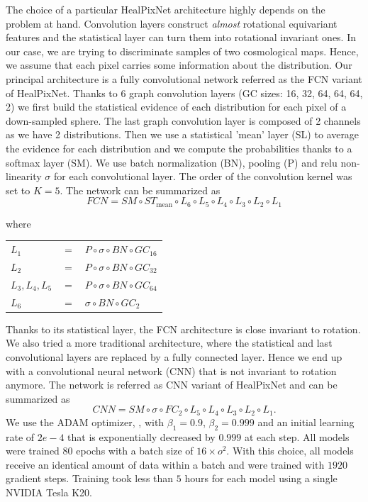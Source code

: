 \documentclass[final,twocolumn,3p,times,authoryear]{elsarticle}
\newcommand{\1}{\b{1}}              %
\newcommand{\0}{\b{0}}              %
\begin{document}
The choice of a particular HealPixNet architecture highly depends on the problem at hand. Convolution layers construct \emph{almost} rotational equivariant features and the statistical layer can turn them into rotational invariant ones. In our case, we are trying to discriminate samples of two cosmological maps. Hence, we assume that each pixel carries some information about the distribution. Our principal architecture is a fully convolutional network referred as the FCN variant of HealPixNet. Thanks to 6 graph convolution layers (GC sizes: 16, 32, 64, 64, 64, 2) we first build the statistical evidence of each distribution for each pixel of a down-sampled sphere. The last graph convolution layer is composed of 2 channels as we have 2 distributions. Then we use a statistical 'mean' layer (SL) to average the evidence for each distribution and we compute the probabilities thanks to a softmax layer (SM). We use batch normalization (BN), pooling (P) and relu non-linearity $\sigma$ for each convolutional layer. The order of the convolution kernel was set to $K=5$. The network can be summarized as
\begin{equation}
FCN = SM \circ ST_{\text{mean}} \circ L_6 \circ L_5 \circ L_4 \circ L_3 \circ L_2 \circ L_1
\end{equation}
\begin{center}
where \hspace{0.5cm} \begin{tabular}{lll}
   $L_1$ &  $=$ &$ P  \circ \sigma \circ BN  \circ GC_{16}$ \\
   $L_2$ &  $=$ &$ P  \circ \sigma \circ BN  \circ GC_{32}$ \\
   $L_3,L_4,L_5$ & $=$ &$ P \circ  \sigma \circ BN  \circ GC_{64}$ \\
   $L_6$ &  $=$& $ \sigma \circ BN  \circ GC_{2}$ \\
\end{tabular}
\end{center}
Thanks to its statistical layer, the FCN architecture is close invariant to rotation.
We also tried a more traditional architecture, where the statistical and last convolutional layers are replaced by a fully connected layer. Hence we end up with a convolutional neural network (CNN) that is not invariant to rotation anymore. The network is referred as CNN variant of HealPixNet and can be summarized as
\begin{equation}
CNN = SM \circ \sigma \circ FC_2 \circ L_5 \circ L_4 \circ L_3 \circ L_2 \circ L_1.
\end{equation}
We use the ADAM optimizer, \cite{kingma2014adam}, with $\beta_1=0.9$, $\beta_2=0.999$ and an initial learning rate of $2e-4$ that is exponentially decreased by $0.999$ at each step.
All models were trained $80$ epochs with a batch size of $16\times o^2$. With this choice, all models receive an identical amount of data within a batch and were trained with $1920$ gradient steps.
Training took less than $5$ hours for each model using a single NVIDIA Tesla K20.
\end{document}

